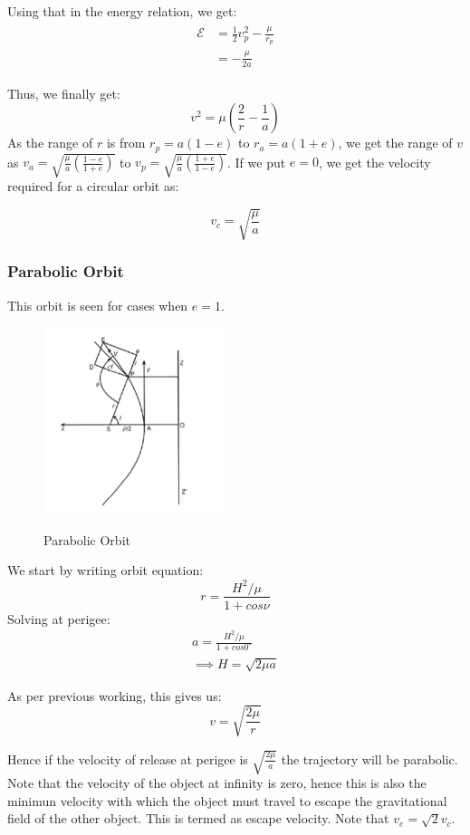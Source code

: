 \documentclass[12pt, letterpaper]{article}
\begin{document}
Using that in the energy relation, we get:
\begin{gather*}
\begin{split}
	\mathcal{E} &= \frac{1}{2}v_p^2 - \frac{\mu}{r_p}\\
	&= - \frac{\mu}{2a}
\end{split}
\end{gather*}

Thus, we finally get:
\[ v^2  = \mu \left(\frac{2}{r} - \frac{1}{a}\right) \]
As the range of $r$ is from $r_p = a(1-e)$ to $r_a = a(1+e)$, we get the range of $v$ as $v_a = \sqrt{\frac{\mu}{a}\left(\frac{1-e}{1+e}\right)} $ to $v_p =  \sqrt{\frac{\mu}{a}\left(\frac{1+e}{1-e}\right)} $. If we put $e=0$, we get the velocity required for a circular orbit as:

\[ v_c = \sqrt{\frac{\mu}{a}} \]
\newpage
\subsubsection{Parabolic Orbit}
This orbit is seen for cases when $e=1$. 

\begin{figure}[ht]
	\centering
    \includegraphics[width = 200px]{parabola}
    \label{fig:parabola}
    \caption{Parabolic Orbit}
\end{figure}
We start by writing orbit equation:
\[ r = \frac{H^2/\mu}{1+cos\nu} \]
Solving at perigee:
\begin{gather*}
	a = \frac{H^2/\mu}{1+cos0^\circ}\\
	\implies H = \sqrt{2\mu a}
\end{gather*}

As per previous working, this gives us:
\[ v = \sqrt{\frac{2\mu}{r}} \]

Hence if the velocity of release at perigee is $\sqrt{\frac{2\mu}{a}}$ the trajectory will be parabolic. Note that the velocity of the object at infinity is zero, hence this is also the minimun velocity with which the object must travel to escape the gravitational field of the other object. This is termed as escape velocity. Note that $v_e = \sqrt{2}v_c$.
\newpage
\end{document}
